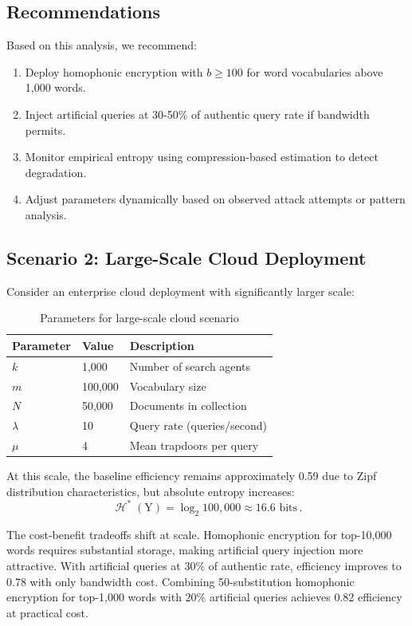 \documentclass[final,11pt]{article}
\newcommand{\rv}[1]{\mathrm{#1}}
\newcommand{\entropy}{\operatorname{\mathcal{H}}}
\numberwithin{equation}{section}
\theoremstyle{plain}
\theoremstyle{remark}
\begin{document}
\subsection{Recommendations}
Based on this analysis, we recommend:
\begin{enumerate}
    \item Deploy homophonic encryption with $b \geq 100$ for word vocabularies above 1,000 words.
    \item Inject artificial queries at 30-50\% of authentic query rate if bandwidth permits.
    \item Monitor empirical entropy using compression-based estimation to detect degradation.
    \item Adjust parameters dynamically based on observed attack attempts or pattern analysis.
\end{enumerate}

\subsection{Scenario 2: Large-Scale Cloud Deployment}
Consider an enterprise cloud deployment with significantly larger scale:

\begin{table}[h]
\centering
\caption{Parameters for large-scale cloud scenario}
\begin{tabular}{@{} l l l @{}}
\toprule
\textbf{Parameter} & \textbf{Value} & \textbf{Description}\\
\midrule
$k$ & 1,000 & Number of search agents\\
$m$ & 100,000 & Vocabulary size\\
$N$ & 50,000 & Documents in collection\\
$\lambda$ & 10 & Query rate (queries/second)\\
$\mu$ & 4 & Mean trapdoors per query\\
\bottomrule
\end{tabular}
\end{table}

At this scale, the baseline efficiency remains approximately 0.59 due to Zipf distribution characteristics, but absolute entropy increases:
\begin{equation}
    \entropy^*(\rv{Y}) = \log_2 100{,}000 \approx 16.6 \text{ bits}\,.
\end{equation}

The cost-benefit tradeoffs shift at scale. Homophonic encryption for top-10,000 words requires substantial storage, making artificial query injection more attractive. With artificial queries at 30\% of authentic rate, efficiency improves to 0.78 with only bandwidth cost. Combining 50-substitution homophonic encryption for top-1,000 words with 20\% artificial queries achieves 0.82 efficiency at practical cost.
\end{document}
